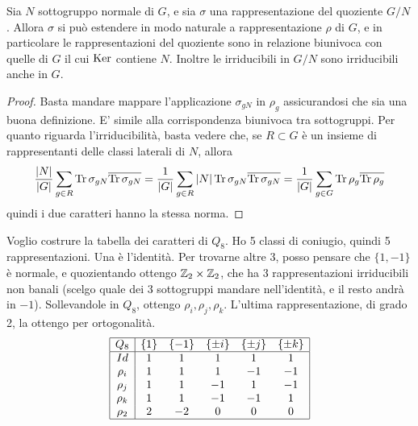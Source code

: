 		\begin{myprop}
			Sia $N$ sottogruppo normale di $G$, e sia $\sigma$ una rappresentazione del quoziente $G/N$. Allora $\sigma$ si può estendere in modo naturale a rappresentazione $\rho$ di $G$, e in particolare le rappresentazioni del quoziente sono in relazione biunivoca con quelle di $G$ il cui $\operatorname{Ker}$ contiene $N$. Inoltre le irriducibili in $G/N$ sono irriducibili anche in $G$.
		\end{myprop}
		\begin{proof}
			Basta mandare mappare l'applicazione $\sigma_{gN}$ in $\rho_g$ assicurandosi che sia una buona definizione. E' simile alla corrispondenza biunivoca tra sottogruppi.
			Per quanto riguarda l'irriducibilità, basta vedere che, se $R\subset G$ è un insieme di rappresentanti delle classi laterali di $N$, allora 
			\[
				\frac{\left|N\right|}{\left|G\right|} \sum_{g\in R}\operatorname{Tr} \sigma_{gN}\overline{\operatorname{Tr} \sigma_{gN}} = \frac1{\left|G\right|} \sum_{g\in R} \left|N\right| \operatorname{Tr} \sigma_{gN}\overline{\operatorname{Tr} \sigma_{gN}} = \frac1{\left|G\right|} \sum_{g\in G} \operatorname{Tr}\rho_g\overline{\operatorname{Tr} \rho_{g}}
			\]
			quindi i due caratteri hanno la stessa norma.
		\end{proof}
		
		\begin{myexample} 
		Voglio costrure la tabella dei caratteri di $Q_8$. Ho 5 classi di coniugio, quindi 5 rappresentazioni. Una è l'identità. Per trovarne altre 3, posso pensare che $\{1,-1\}$ è normale, e quozientando ottengo $\mathbb Z_2 \times \mathbb Z_2$, che ha 3 rappresentazioni irriducibili non banali (scelgo quale dei 3 sottogruppi mandare nell'identità, e il resto andrà in $-1$). Sollevandole in $Q_8$, ottengo $\rho_i,\rho_j,\rho_k$. L'ultima rappresentazione, di grado 2, la ottengo per ortogonalità.
		\[
			\begin{array}{|c|ccccc|}
			\hline
			Q_8    & \{1\} & \{-1\} & \{\pm i\} & \{\pm j\} & \{\pm k\} \\ \hline
			Id     &   1   &    1   &     1     &     1     &     1     \\ 
			\rho_i &   1   &    1   &     1     &    -1     &    -1     \\
			\rho_j &   1   &    1   &    -1     &     1     &    -1     \\
			\rho_k &   1   &    1   &    -1     &    -1     &     1     \\
			\rho_2 &   2   &   -2   &     0     &     0     &     0     \\ \hline
			\end{array}
		\]
		
		
		\end{myexample}


